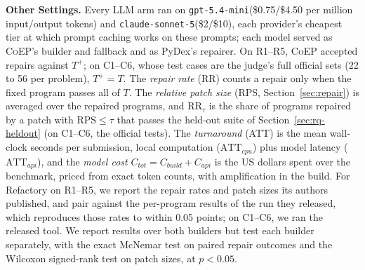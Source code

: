 \documentclass[acmsmall,screen,review,anonymous,nonacm]{acmart}
\newcommand{\tool}{\textsc{CoEP}\xspace}
\newcommand{\V}[1]{\ensuremath{\mathit{#1}}}
\newcommand{\RPS}{\mathrm{RPS}}
\newcommand{\cs}{\texttt{claude-sonnet-5}\xspace}
\newcommand{\gm}{\texttt{gpt-5.4-mini}\xspace}
\begin{document}
\textbf{Other Settings.} Every LLM arm ran on \gm (\$0.75/\$4.50 per million input/output tokens) and \cs (\$2/\$10), each provider's cheapest tier at which prompt caching works on these prompts; each model served as \tool's builder and fallback and as PyDex's repairer. On R1--R5, \tool accepted repairs against $T^{+}$; on C1--C6, whose test cases are the judge's full official sets (22 to 56 per problem), $T^{+} = T$. The \emph{repair rate} (RR) counts a repair only when the fixed program passes all of $T$. The \emph{relative patch size} (RPS, Section~\ref{sec:repair}) is averaged over the repaired programs, and $\mathrm{RR}_{\tau}$ is the share of programs repaired by a patch with $\RPS \le \tau$ that passes the held-out suite of Section~\ref{sec:rq-heldout} (on C1--C6, the official tests). The \emph{turnaround} (ATT) is the mean wall-clock seconds per submission, local computation ($\mathrm{ATT}_{\V{cpu}}$) plus model latency ($\mathrm{ATT}_{\V{api}}$), and the \emph{model cost} $C_{\V{tot}} = C_{\V{build}} + C_{\V{api}}$ is the US dollars spent over the benchmark, priced from exact token counts, with amplification in the build. For Refactory on R1--R5, we report the repair rates and patch sizes its authors published, and pair against the per-program results of the run they released, which reproduces those rates to within 0.05 points; on C1--C6, we ran the released tool. We report results over both builders but test each builder separately, with the exact McNemar test on paired repair outcomes and the Wilcoxon signed-rank test on patch sizes, at $p < 0.05$.
\end{document}
